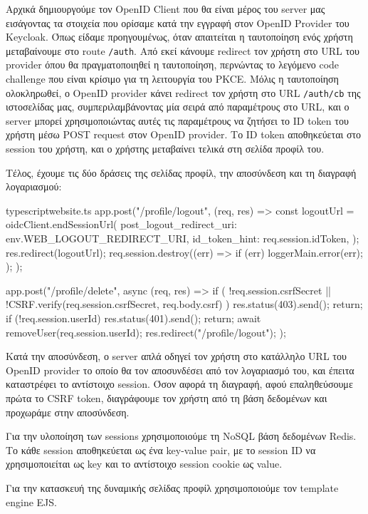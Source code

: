 \documentclass[../thesis.tex]{subfiles}
\begin{document}
Αρχικά δημιουργούμε τον OpenID Client που θα είναι μέρος του server μας εισάγοντας τα στοιχεία που ορίσαμε κατά την εγγραφή στον OpenID Provider του Keycloak.
Όπως είδαμε προηγουμένως, όταν απαιτείται η ταυτοποίηση ενός χρήστη μεταβαίνουμε στο route \verb|/auth|.
Από εκεί κάνουμε redirect τον χρήστη στο URL του provider όπου θα πραγματοποιηθεί η ταυτοποίηση, περνώντας το λεγόμενο code challenge που είναι κρίσιμο για τη λειτουργία του PKCE.
Μόλις η ταυτοποίηση ολοκληρωθεί, ο OpenID provider κάνει redirect τον χρήστη στο URL \verb|/auth/cb| της ιστοσελίδας μας, συμπεριλαμβάνοντας μία σειρά από παραμέτρους στο URL, και ο server μπορεί χρησιμοποιώντας αυτές τις παραμέτρους να ζητήσει το ID token του χρήστη μέσω POST request στον OpenID provider.
Το ID token αποθηκεύεται στο session του χρήστη, και ο χρήστης μεταβαίνει τελικά στη σελίδα προφίλ του.

Τέλος, έχουμε τις δύο δράσεις της σελίδας προφίλ, την αποσύνδεση και τη διαγραφή λογαριασμού:

\begin{codeblock}{typescript}{website.ts}
  app.post("/profile/logout", (req, res) => {
    const logoutUrl = oidcClient.endSessionUrl({
      post_logout_redirect_uri: env.WEB_LOGOUT_REDIRECT_URI,
      id_token_hint: req.session.idToken,
    });
    res.redirect(logoutUrl);
    req.session.destroy((err) => {
      if (err) loggerMain.error(err);
    });
  });

  app.post("/profile/delete", async (req, res) => {
    if (
      !req.session.csrfSecret ||
      !CSRF.verify(req.session.csrfSecret, req.body.csrf)
    ) {
      res.status(403).send();
      return;
    }
    if (!req.session.userId) {
      res.status(401).send();
      return;
    }
    await removeUser(req.session.userId);
    res.redirect("/profile/logout");
  });
\end{codeblock}

Κατά την αποσύνδεση, ο server απλά οδηγεί τον χρήστη στο κατάλληλο URL του OpenID provider το οποίο θα τον αποσυνδέσει από τον λογαριασμό του, και έπειτα καταστρέφει το αντίστοιχο session.
Όσον αφορά τη διαγραφή, αφού επαληθεύσουμε πρώτα το CSRF token, διαγράφουμε τον χρήστη από τη βάση δεδομένων και προχωράμε στην αποσύνδεση.


Για την υλοποίηση των sessions χρησιμοποιούμε τη NoSQL βάση δεδομένων Redis.
Το κάθε session αποθηκεύεται ως ένα key-value pair, με το session ID να χρησιμοποιείται ως key και το αντίστοιχο session cookie ως value.

Για την κατασκευή της δυναμικής σελίδας προφίλ χρησιμοποιούμε τον template engine EJS.
\end{document}
